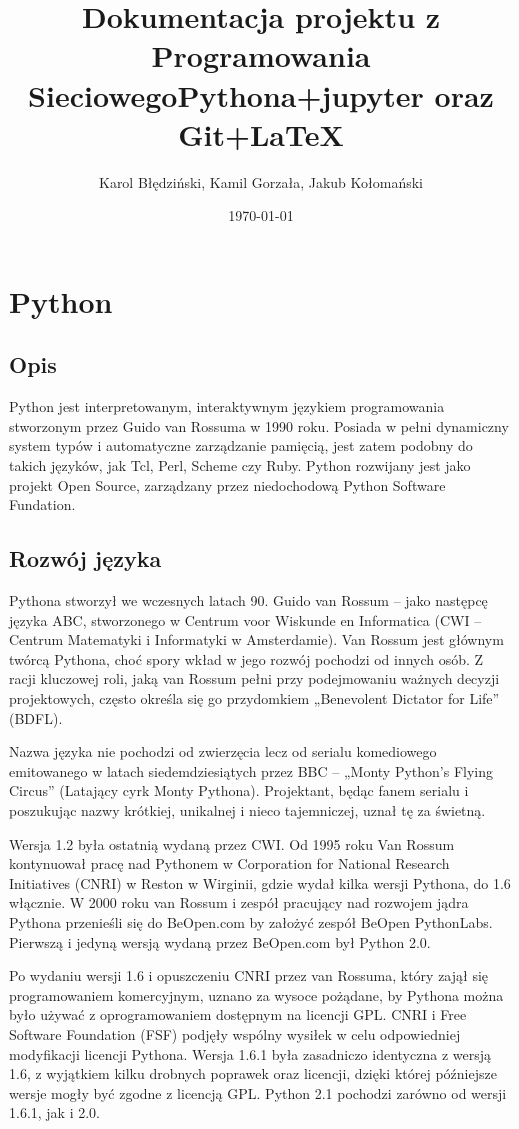 \documentclass{article}
\title{Dokumentacja projektu z Programowania Sieciowego}
\date{\today}
\author{Karol Błędziński, Kamil Gorzała, Jakub Kołomański}
\begin{document}
 \maketitle
 \newpage

\title{Pythona+jupyter oraz Git+LaTeX}
\section{Python}
\subsection{Opis}
	Python jest interpretowanym, interaktywnym językiem programowania stworzonym przez Guido van Rossuma w 1990 roku. Posiada w pełni dynamiczny system typów i automatyczne zarządzanie pamięcią, jest zatem podobny do takich języków, jak Tcl, Perl, Scheme czy Ruby. Python rozwijany jest jako projekt Open Source, zarządzany przez niedochodową Python Software Fundation.
\subsection{Rozwój języka}
	Pythona stworzył we wczesnych latach 90. Guido van Rossum – jako następcę języka ABC, stworzonego w Centrum voor Wiskunde en Informatica (CWI – Centrum Matematyki i Informatyki w Amsterdamie). Van Rossum jest głównym twórcą Pythona, choć spory wkład w jego rozwój pochodzi od innych osób. Z racji kluczowej roli, jaką van Rossum pełni przy podejmowaniu ważnych decyzji projektowych, często określa się go przydomkiem „Benevolent Dictator for Life” (BDFL).

Nazwa języka nie pochodzi od zwierzęcia lecz od serialu komediowego emitowanego w latach siedemdziesiątych przez BBC – „Monty Python’s Flying Circus” (Latający cyrk Monty Pythona). Projektant, będąc fanem serialu i poszukując nazwy krótkiej, unikalnej i nieco tajemniczej, uznał tę za świetną.

Wersja 1.2 była ostatnią wydaną przez CWI. Od 1995 roku Van Rossum kontynuował pracę nad Pythonem w Corporation for National Research Initiatives (CNRI) w Reston w Wirginii, gdzie wydał kilka wersji Pythona, do 1.6 włącznie. W 2000 roku van Rossum i zespół pracujący nad rozwojem jądra Pythona przenieśli się do BeOpen.com by założyć zespół BeOpen PythonLabs. Pierwszą i jedyną wersją wydaną przez BeOpen.com był Python 2.0.

Po wydaniu wersji 1.6 i opuszczeniu CNRI przez van Rossuma, który zajął się programowaniem komercyjnym, uznano za wysoce pożądane, by Pythona można było używać z oprogramowaniem dostępnym na licencji GPL. CNRI i Free Software Foundation (FSF) podjęły wspólny wysiłek w celu odpowiedniej modyfikacji licencji Pythona. Wersja 1.6.1 była zasadniczo identyczna z wersją 1.6, z wyjątkiem kilku drobnych poprawek oraz licencji, dzięki której późniejsze wersje mogły być zgodne z licencją GPL. Python 2.1 pochodzi zarówno od wersji 1.6.1, jak i 2.0.
\end{document}
